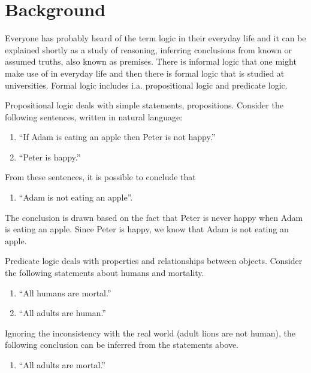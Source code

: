 \section{Background}

Everyone has probably heard of the term logic in their everyday life and it can be explained shortly as a study of reasoning, inferring conclusions from known or assumed truths, also known as premises. There is informal logic that one might make use of in everyday life and then there is formal logic that is studied at universities. Formal logic includes i.a. propositional logic and predicate logic.

Propositional logic deals with simple statements, propositions. Consider the following sentences, written in natural language:

\begin{enumerate}
      \item ``If Adam is eating an apple then Peter is not happy.''
      \item ``Peter is happy.''
\end{enumerate}

From these sentences, it is possible to conclude that

\begin{enumerate}[resume]
      \item ``Adam is not eating an apple''.
\end{enumerate}

The conclusion is drawn based on the fact that Peter is never happy when Adam is eating an apple. Since Peter is happy, we know that Adam is not eating an apple.

Predicate logic deals with properties and relationships between objects. Consider the following statements about humans and mortality.

\begin{enumerate}[resume]
      \item ``All humans are mortal.''
      \item ``All adults are human.''
\end{enumerate}

Ignoring the inconsistency with the real world (adult lions are not human), the following conclusion can be inferred from the statements above.

\begin{enumerate}[resume]
      \item ``All adults are mortal.''
\end{enumerate}

